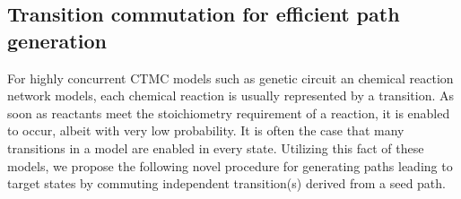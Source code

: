\subsection{Transition commutation for efficient path generation}

For highly concurrent CTMC models such as genetic circuit
an chemical reaction network models, each chemical reaction is usually
represented by a transition. As soon as reactants meet the
stoichiometry requirement of a reaction, it is enabled to occur,
albeit with very low probability. It is often the case that
many transitions in a model are enabled in every state. Utilizing this
fact of these models, we propose the following novel procedure for
generating paths leading to target states by commuting independent
transition(s) derived from a seed path. 






